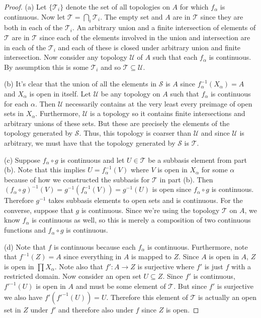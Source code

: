 \documentclass{article}
\begin{document}
\begin{proof}
(a) Let $\{\mathcal{T}_i\}$ denote the set of all topologies on $A$ for which $f_{\alpha}$ is continuous. Now let $\mathcal{T} = \bigcap_i \mathcal{T}_i$. The empty set and $A$ are in $\mathcal{T}$ since they are both in each of the $\mathcal{T}_i$. An arbitrary union and a finite intersection of elements of $\mathcal{T}$ are in $\mathcal{T}$ since each of the elements involved in the union and intersection are in each of the $\mathcal{T}_i$ and each of these is closed under arbitrary union and finite intersection. Now consider any topology $\mathcal{U}$ of $A$ such that each $f_{\alpha}$ is continuous. By assumption this is some $\mathcal{T}_i$ and so $\mathcal{T} \subseteq \mathcal{U}$.

(b) It's clear that the union of all the elements in $\mathcal{S}$ is $A$ since $f^{-1}_{\alpha}(X_{\alpha}) = A$ and $X_{\alpha}$ is open in itself. Let $\mathcal{U}$ be any topology on $A$ such that $f_{\alpha}$ is continuous for each $\alpha$. Then $\mathcal{U}$ necessarily contains at the very least every preimage of open sets in $X_{\alpha}$. Furthermore, $\mathcal{U}$ is a topology so it contains finite intersections and arbitrary unions of these sets. But these are precisely the elements of the topology generated by $\mathcal{S}$. Thus, this topology is coarser than $\mathcal{U}$ and since $\mathcal{U}$ is arbitrary, we must have that the topology generated by $\mathcal{S}$ is $\mathcal{T}$.

(c) Suppose $f_{\alpha} \circ g$ is continuous and let $U \in \mathcal{T}$ be a subbasis element from part (b). Note that this implies $U = f^{-1}_{\alpha}(V)$ where $V$ is open in $X_{\alpha}$ for some $\alpha$ because of how we constructed the subbasis for $\mathcal{T}$ in part (b). Then $(f_{\alpha} \circ g)^{-1}(V) = g^{-1}(f_{\alpha}^{-1}(V)) = g^{-1}(U)$ is open since $f_{\alpha} \circ g$ is continuous. Therefore $g^{-1}$ takes subbasis elements to open sets and is continuous. For the converse, suppose that $g$ is continuous. Since we're using the topology $\mathcal{T}$ on $A$, we know $f_{\alpha}$ is continuous as well, so this is merely a composition of two continuous functions and $f_{\alpha} \circ g$ is continuous.

(d) Note that $f$ is continuous because each $f_{\alpha}$ is continuous. Furthermore, note that $f^{-1}(Z) = A$ since everything in $A$ is mapped to $Z$. Since $A$ is open in $A$, $Z$ is open in $\prod X_{\alpha}$. Note also that $f' : A \to Z$ is surjective where $f'$ is just $f$ with a restricted domain. Now consider an open set $U \subseteq Z$. Since $f'$ is continuous, $f'^{-1}(U)$ is open in $A$ and must be some element of $\mathcal{T}$. But since $f'$ is surjective we also have $f'(f'^{-1}(U)) = U$. Therefore this element of $\mathcal{T}$ is actually an open set in $Z$ under $f'$ and therefore also under $f$ since $Z$ is open.


\end{proof}
\end{document}
